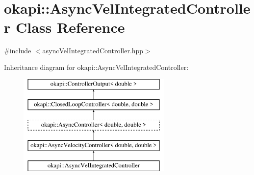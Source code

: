 \hypertarget{classokapi_1_1AsyncVelIntegratedController}{}\section{okapi\+::Async\+Vel\+Integrated\+Controller Class Reference}
\label{classokapi_1_1AsyncVelIntegratedController}


{\ttfamily \#include $<$async\+Vel\+Integrated\+Controller.\+hpp$>$}

Inheritance diagram for okapi\+::Async\+Vel\+Integrated\+Controller\+:\begin{figure}[H]
\begin{center}
\leavevmode
\includegraphics[height=5.000000cm]{classokapi_1_1AsyncVelIntegratedController}
\end{center}
\end{figure}
